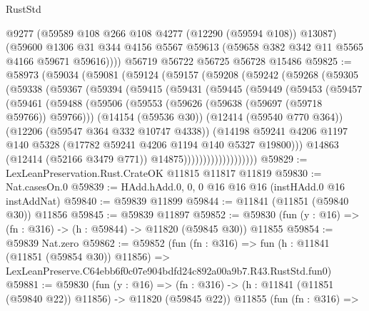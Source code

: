 \begin{lexlean}{RustStd}
\begin{coremodule}
        @9277
        (@59589 @108 @266 @108 @4277 (@12290 (@59594 @108)) @13087)
        (@59600
          @1306
          @31
          @344
          @4156
          @5567
          @59613
          (@59658 @382 @342 @11 @5565 @4166 @59671 @59616))))
    @56719
    @56722
    @56725
    @56728
    @15486
@59825 := @58973
    (@59034
      (@59081
        (@59124
          (@59157
            (@59208
              (@59242
                (@59268
                  (@59305
                    (@59338
                      (@59367
                        (@59394
                          (@59415
                            (@59431
                              (@59445
                                (@59449
                                  (@59453
                                    (@59457
                                      (@59461
                                        (@59488
                                          (@59506
                                            (@59553
                                              (@59626 (@59638 (@59697 (@59718 @59766)) @59766)))
                                            (@14154 (@59536 @30))
                                            (@12414 (@59540 @770 @364))
                                            (@12206 (@59547 @364 @332 @10747 @4338))
                                            (@14198
                                              @59241
                                              @4206
                                              @1197
                                              @140
                                              @5328
                                              (@17782 @59241 @4206 @1194 @140 @5327 @19800)))
                                          @14863
                                          (@12414 (@52166 @3479 @771))
                                          @14875)))))))))))))))))))
@59829 := LexLeanPreservation.Rust.CrateOK @11815 @11817 @11819
@59830 := Nat.casesOn.{0}
@59839 := HAdd.hAdd.{0, 0, 0} @16 @16 @16 (instHAdd.{0} @16 instAddNat)
@59840 := @59839 @11899
@59844 := @11841 (@11851 (@59840 @30)) @11856
@59845 := @59839 @11897
@59852 := @59830 (fun (y : @16) => (fn : @316) -> (h : @59844) -> @11820 (@59845 @30)) @11855
@59854 := @59839 Nat.zero
@59862 := @59852
    (fun (fn : @316) =>
    fun (h : @11841 (@11851 (@59854 @30)) @11856) =>
    LexLeanPreserve.C64ebb6f0c07e904bdfd24c892a00a9b7.R43.RustStd.fun0)
@59881 := @59830
    (fun (y : @16) =>
    (fn : @316) -> (h : @11841 (@11851 (@59840 @22)) @11856) -> @11820 (@59845 @22))
    @11855
    (fun (fn : @316) =>

\end{coremodule}
\end{lexlean}
